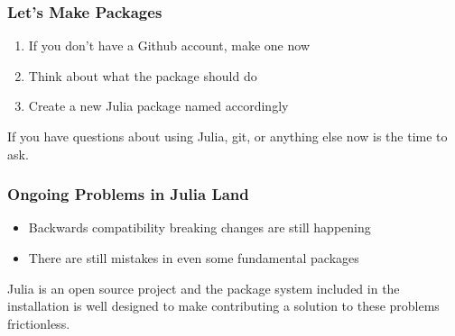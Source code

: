 \documentclass{beamer}
\begin{document}
\begin{frame}
\frametitle{Let's Make Packages}

\begin{enumerate}
  \item If you don't have a Github account, make one now
  \item Think about what the package should do
  \item Create a new Julia package named accordingly
\end{enumerate}

If you have questions about using Julia, git, or anything else now is the time 
to ask.
\end{frame}

\begin{frame}
\frametitle{Ongoing Problems in Julia Land}

\begin{itemize}
  \item Backwards compatibility breaking changes are still happening
  \item There are still mistakes in even some fundamental packages
\end{itemize}

Julia is an open source project and the package system included in the
installation is well designed to make contributing a solution to these 
problems frictionless.

\end{frame}
\end{document}
